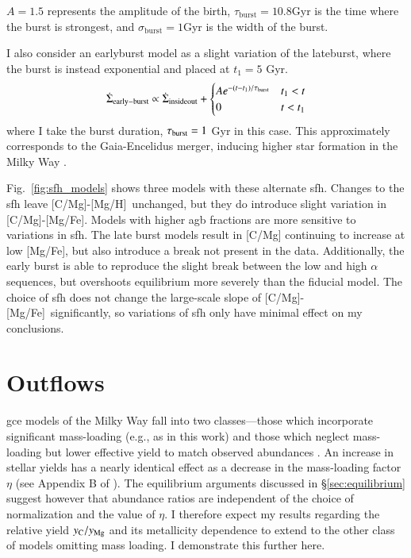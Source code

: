 \documentclass[12pt,oneside,letterpaper]{report}
\newcommand{\agb}{\gls{agb}}
\newcommand{\sfh}{\gls{sfh}}
\newcommand{\gce}{\gls{gce}}
\newcommand{\caah}{[C/Mg]-[Mg/H]}
\newcommand{\caafe}{[C/Mg]-[Mg/Fe]}
\begin{document}
$A=1.5$ represents the amplitude of the birth, $\tau_\text{burst}=10.8$Gyr is the time where the burst is strongest, and $\sigma_\text{burst}=1$Gyr is the width of the burst.

I also consider an earlyburst model as a slight variation of the lateburst, where the burst is instead exponential and placed at $t_1=5$ Gyr. 
\begin{equation}\label{eq:twoinfall}
    \dot{\Sigma}_{\rm early-burst} \propto \dot{\Sigma}_{\rm insideout} + 
\begin{cases}
    Ae^{-(t-t_1)/\tau_{\rm burst}} & t_1 < t \\
      0 & t<t_1
\end{cases}
\end{equation}
where I take the burst duration, $\tau_{\rm burst}=1$ Gyr in this case. 
This approximately corresponds to the Gaia-Encelidus merger, inducing higher star formation in the Milky Way \citep{spitoni21, bonaca20, helmi18}.

Fig.~\ref{fig:sfh_models} shows three models with these alternate \sfh{}. Changes to the \sfh{} leave \caah\ unchanged, but they do introduce slight variation in \caafe. Models with higher \agb{} fractions are more sensitive to variations in \sfh{}. The late burst models result in [C/Mg] continuing to increase at low [Mg/Fe], but also introduce a break not present in the data. Additionally, the early burst
is able to reproduce the slight break between the low and high $\alpha$ sequences, but overshoots equilibrium more severely than the fiducial model. 
The choice of \sfh{} does not change the large-scale slope of \caafe~significantly, so variations of \sfh{} only have minimal effect on my conclusions.

\section{Outflows} \label{sec:outflows}

\gce{} models of the Milky Way fall into two classes---those which incorporate significant mass-loading (e.g., as in this work) and those which neglect mass-loading but lower effective yield to match observed abundances \citep{MCM13, MCM14, spitoni19, spitoni20, spitoni21}.
An increase in stellar yields has a nearly identical effect as a decrease in the mass-loading factor $\eta$ (see Appendix B of \cite{james_dwarf}).
The equilibrium arguments discussed in \S\ref{sec:equilibrium} suggest however that abundance ratios are independent of the choice of normalization and the value of $\eta$. I therefore expect my results regarding the relative yield $y_{\rm C}/y_{\rm Mg}$ and its metallicity dependence to extend to the other class of models omitting mass loading. I demonstrate this further here.
\end{document}

